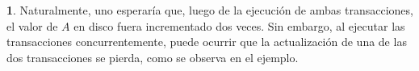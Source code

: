 \documentclass[english]{article}
\theoremstyle{definition}
\theoremstyle{definition}
\newtheorem{example}[thm]{\protect\examplename}
\providecommand{\examplename}{Ejemplo}
\begin{document}
\begin{example}
Naturalmente, uno esperaría que, luego de la ejecución de ambas transacciones,
el valor de $A$ en disco fuera incrementado dos veces. Sin embargo, al
ejecutar las transacciones concurrentemente, puede ocurrir que la
actualización de una de las dos transacciones se pierda, como se observa en el
ejemplo.
\end{example}
\end{document}
